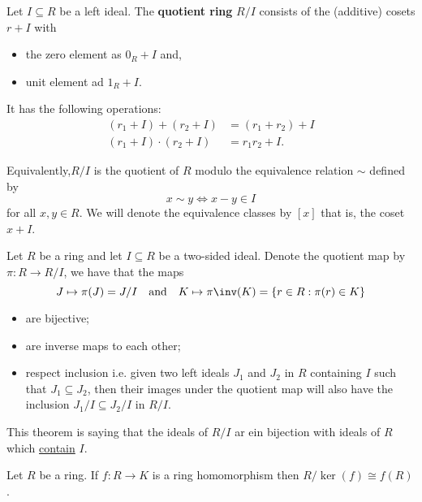 \documentclass[12pt, a4paper]{article}
\begin{document}
\begin{definition}
    Let \(I \subseteq R\) be a left ideal. The \textbf{quotient ring} \(R/I\) consists of the (additive) cosets \(r+I\) with 
    \begin{itemize}
        \item the zero element as \(0_R+I\) and,
        \item unit element ad \(1_R+I\).
    \end{itemize}
    It has the following operations:
    \[\begin{aligned}
        (r_1+I)+(r_2+I)&=(r_1+r_2)+I \\
        (r_1+I)\cdot (r_2+I) &= r_1r_2+I.
    \end{aligned}\]
\end{definition}

\begin{mdremark}
Equivalently,\( R/I \) is the quotient of \( R \) modulo the equivalence relation \( \sim \) defined by
\[x \sim y \iff x - y \in I\]
for all \( x, y \in R \). We will denote the equivalence classes by \( [x] \) that is, the coset \( x + I \).
\end{mdremark}

\begin{proposition}
    Let \(R\) be a ring and let \(I \subseteq R\) be a two-sided ideal. Denote the quotient map by \(\pi:R\to R/I\), we have that the maps 
    \[J \mapsto \pi(J) = J/I \quad \text{and} \quad K\mapsto \pi\inv(K) = \{r \in R : \pi(r) \in K\}\]
    \begin{itemize}
        \item are bijective;
        \item are inverse maps to each other;
        \item respect inclusion i.e. given two left ideals \( J_1 \) and \( J_2 \) in \( R \) containing \( I \) such that \( J_1 \subseteq J_2 \), then their images under the quotient map will also have the inclusion \( J_1/I \subseteq J_2/I \) in \( R/I \).
    \end{itemize}
\end{proposition}

\begin{mdnote}
    This theorem is saying that the ideals of \(R/I\) ar ein bijection with ideals of \(R\) which \ul{contain} \(I\).
\end{mdnote}

\begin{mdthm}
    Let \(R\) be a ring. If \(f : R \to K\) is a ring homomorphism then \(R/\ker(f) \cong f(R)\).
\end{mdthm}
\end{document}

